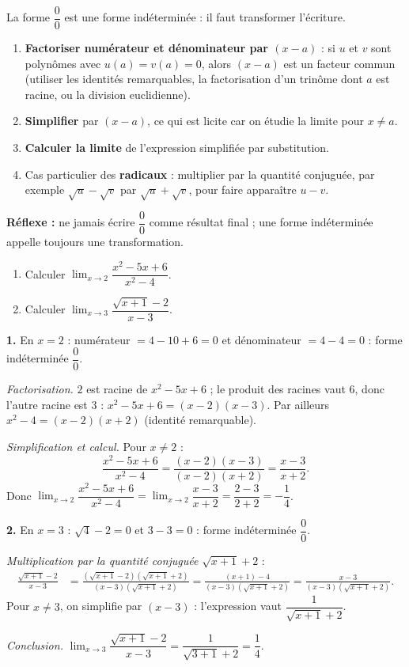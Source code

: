 \documentclass[11pt]{article}
\newcommand{\cle}[1]{{\popxbold\color{popdark}#1}}
\begin{document}
\begin{methode}[Limite de $\dfrac{u}{v}$ en $a$ lorsque $u(a)=v(a)=0$]
La forme $\dfrac{0}{0}$ est une \cle{forme indéterminée} : il faut transformer l'écriture.
\begin{enumerate}
\item \textbf{Factoriser numérateur et dénominateur par $(x-a)$} : si $u$ et $v$ sont polynômes avec $u(a)=v(a)=0$, alors $(x-a)$ est un facteur commun (utiliser les identités remarquables, la factorisation d'un trinôme dont $a$ est racine, ou la division euclidienne).
\item \textbf{Simplifier} par $(x-a)$, ce qui est licite car on étudie la limite pour $x\neq a$.
\item \textbf{Calculer la limite} de l'expression simplifiée par substitution.
\item Cas particulier des \textbf{radicaux} : multiplier par la \cle{quantité conjuguée}, par exemple $\sqrt{u}-\sqrt{v}$ par $\sqrt{u}+\sqrt{v}$, pour faire apparaître $u-v$.
\end{enumerate}
\textbf{Réflexe :} ne jamais écrire $\dfrac{0}{0}$ comme résultat final ; une forme indéterminée appelle toujours une transformation.
\end{methode}

\begin{exoresolu}
\begin{enumerate}
\item Calculer $\lim_{x\to 2}\dfrac{x^2-5x+6}{x^2-4}$.
\item Calculer $\lim_{x\to 3}\dfrac{\sqrt{x+1}-2}{x-3}$.
\end{enumerate}
\tcblower
\textbf{1.} En $x=2$ : numérateur $=4-10+6=0$ et dénominateur $=4-4=0$ : forme indéterminée $\dfrac{0}{0}$.

\emph{Factorisation.} $2$ est racine de $x^2-5x+6$ ; le produit des racines vaut $6$, donc l'autre racine est $3$ : $x^2-5x+6=(x-2)(x-3)$. Par ailleurs $x^2-4=(x-2)(x+2)$ (identité remarquable).

\emph{Simplification et calcul.} Pour $x\neq 2$ :
\[ \frac{x^2-5x+6}{x^2-4}=\frac{(x-2)(x-3)}{(x-2)(x+2)}=\frac{x-3}{x+2}. \]
Donc $\lim_{x\to 2}\dfrac{x^2-5x+6}{x^2-4}=\lim_{x\to 2}\dfrac{x-3}{x+2}=\dfrac{2-3}{2+2}=-\dfrac{1}{4}$.

\textbf{2.} En $x=3$ : $\sqrt{4}-2=0$ et $3-3=0$ : forme indéterminée $\dfrac{0}{0}$.

\emph{Multiplication par la quantité conjuguée} $\sqrt{x+1}+2$ :
\begin{align*}
\frac{\sqrt{x+1}-2}{x-3} &= \frac{(\sqrt{x+1}-2)(\sqrt{x+1}+2)}{(x-3)(\sqrt{x+1}+2)} = \frac{(x+1)-4}{(x-3)(\sqrt{x+1}+2)} = \frac{x-3}{(x-3)(\sqrt{x+1}+2)}.
\end{align*}
Pour $x\neq 3$, on simplifie par $(x-3)$ : l'expression vaut $\dfrac{1}{\sqrt{x+1}+2}$.

\emph{Conclusion.} $\lim_{x\to 3}\dfrac{\sqrt{x+1}-2}{x-3}=\dfrac{1}{\sqrt{3+1}+2}=\dfrac{1}{4}$.
\end{exoresolu}
\end{document}

